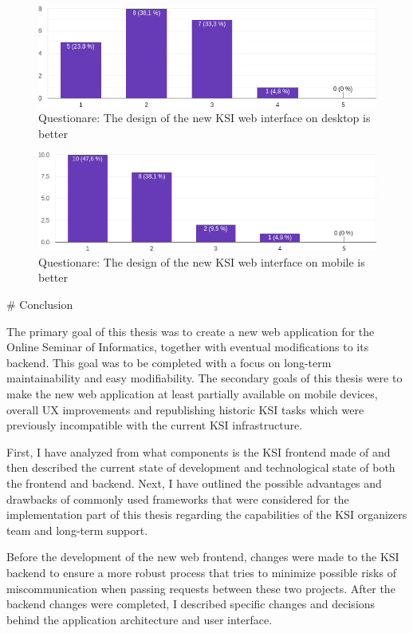 \documentclass[
  digital, %
  oneside, %
  lof,     %
  nolot,     %
]{fithesis4}
\begin{document}
{\begin{figure}
\includegraphics[width=\textwidth]{assets/img/questionare/pc-ui}
\caption{Questionare: The design of the new KSI web interface on desktop is better}
\label{fig:q-ui-pc}
\end{figure}

\begin{figure}
\includegraphics[width=\textwidth]{assets/img/questionare/mobile-ui}
\caption{Questionare: The design of the new KSI web interface on mobile is better}
\label{fig:q-ui-mobile}
\end{figure}

# Conclusion

The primary goal of this thesis was to create a new web application for the Online Seminar of Informatics, together with eventual modifications to its backend. This goal was to be completed with a focus on long-term maintainability and easy modifiability. The secondary goals of this thesis were to make the new web application at least partially available on mobile devices, overall UX improvements and republishing historic KSI tasks which were previously incompatible with the current KSI infrastructure.

First, I have analyzed from what components is the KSI frontend made of and then described the current state of development and technological state of both the frontend and backend. Next, I have outlined the possible advantages and drawbacks of commonly used frameworks that were considered for the implementation part of this thesis regarding the capabilities of the KSI organizers team and long-term support.

Before the development of the new web frontend, changes were made to the KSI backend to ensure a more robust process that tries to minimize possible risks of miscommunication when passing requests between these two projects. After the backend changes were completed, I described specific changes and decisions behind the application architecture and user interface.

}
\end{document}
